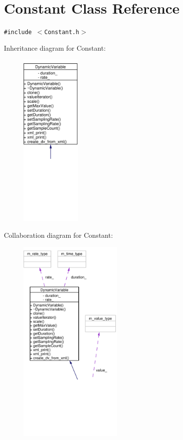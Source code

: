 \hypertarget{classConstant}{
\section{Constant Class Reference}
\label{classConstant}
}
{\tt \#include $<$Constant.h$>$}

Inheritance diagram for Constant:\begin{figure}[H]
\begin{center}
\leavevmode
\includegraphics[width=84pt]{classConstant__inherit__graph}
\end{center}
\end{figure}
Collaboration diagram for Constant:\begin{figure}[H]
\begin{center}
\leavevmode
\includegraphics[width=144pt]{classConstant__coll__graph}
\end{center}
\end{figure}
